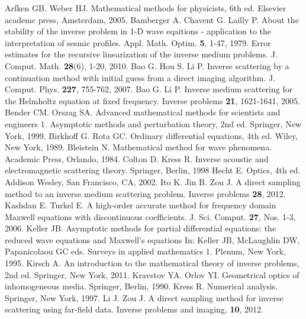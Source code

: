 \documentclass[12pt,twoside]{report}
\begin{document}
\begin{thebibliography}{2d}
Arfken GB. Weber HJ. Mathematical methods for physicists, 6th ed. Elsevier academc press, Amsterdam, 2005.
Bamberger A. Chavent G. Lailly P. About the stability of the inverse problem in 1-D wave eqaitions - application to the interpretation of sesmic profiles. Appl. Math. Optim. \textbf{5}, 1-47, 1979.
Error estimates for the recursive linearization of the inverse medium problems. J. Comput. Math. \textbf{28}(6), 1-20, 2010.
Bao G. Hou S. Li P. Inverse scattering by a continuation method with initial guess from a direct imaging algorithm. J. Comput. Phys. \textbf{227}, 755-762, 2007.
Bao G. Li P. Inverse medium scattering for the Helmholtz equation at fixed frequency. Inverse problems \textbf{21}, 1621-1641, 2005.
Bender CM. Orszag SA. Advanced mathematical methods for scientists and engineers 1. Asymptotic methods and perturbation theory, 2nd ed. Springer, New York, 1999.
Birkhoff G. Rota GC. Ordinary differential equations, 4th ed. Wiley, New York, 1989.
Bleistein N. Mathematical method for wave phenomena. Academic Press, Orlando, 1984.
Colton D. Kress R. Inverse acoustic and electromagnetic scattering theory. Springer, Berlin, 1998 
Hecht E. Optics, 4th ed. Addison Wesley, San Francisco, CA, 2002.
Ito K. Jin B. Zou J. A direct sampling method to an inverse medium scattering problem. Inverse problems \textbf{28}, 2012.
Kashdan E. Turkel E. A high-order accurate method for frequency domain Maxwell equations with discontinuous coefficients. J. Sci. Comput. \textbf{27}, Nos. 1-3, 2006.  
Keller JB. Asymptotic methods for partial differential equations: the reduced wave equations and Maxwell's equations In: Keller JB, McLaughlin DW, Papanicolaou GC eds. Surveys in applied mathematics 1. Plenum, New York, 1995.
Kirsch A. An introduction to the mathematical theory of inverse problems, 2nd ed. Springer, New York, 2011.
Kravstov YA. Orlov YI. Geometrical optics of inhomogeneous media. Springer, Berlin, 1990.
Kress R. Numerical analysis. Springer, New York, 1997.
Li J. Zou J. A direct sampling method for inverse scattering using far-field data. Inverse problems and imaging, \textbf{10}, 2012.

\end{thebibliography}
\end{document}
